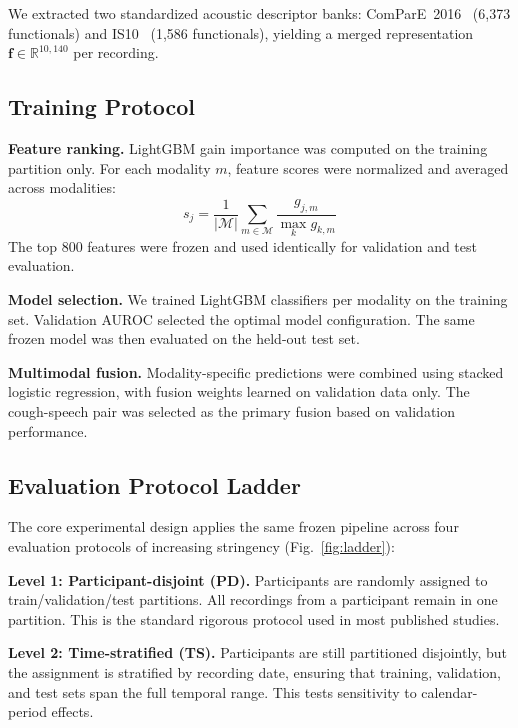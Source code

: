 \documentclass[conference]{IEEEtran}
\begin{document}
We extracted two standardized acoustic descriptor banks: ComParE~2016~\cite{schuller2016compare} (6{,}373 functionals) and IS10~\cite{schuller2010is} (1{,}586 functionals), yielding a merged representation $\mathbf{f} \in \mathbb{R}^{10{,}140}$ per recording.

\subsection{Training Protocol}

\textbf{Feature ranking.} LightGBM gain importance was computed on the training partition only. For each modality $m$, feature scores were normalized and averaged across modalities:
\begin{equation}
s_j = \frac{1}{|\mathcal{M}|} \sum_{m \in \mathcal{M}} \frac{g_{j,m}}{\max_k g_{k,m}}
\end{equation}
The top 800 features were frozen and used identically for validation and test evaluation.

\textbf{Model selection.} We trained LightGBM classifiers per modality on the training set. Validation AUROC selected the optimal model configuration. The same frozen model was then evaluated on the held-out test set.

\textbf{Multimodal fusion.} Modality-specific predictions were combined using stacked logistic regression, with fusion weights learned on validation data only. The cough-speech pair was selected as the primary fusion based on validation performance.

\subsection{Evaluation Protocol Ladder}

The core experimental design applies the same frozen pipeline across four evaluation protocols of increasing stringency (Fig.~\ref{fig:ladder}):

\textbf{Level 1: Participant-disjoint (PD).} Participants are randomly assigned to train/validation/test partitions. All recordings from a participant remain in one partition. This is the standard rigorous protocol used in most published studies.

\textbf{Level 2: Time-stratified (TS).} Participants are still partitioned disjointly, but the assignment is stratified by recording date, ensuring that training, validation, and test sets span the full temporal range. This tests sensitivity to calendar-period effects.
\end{document}

